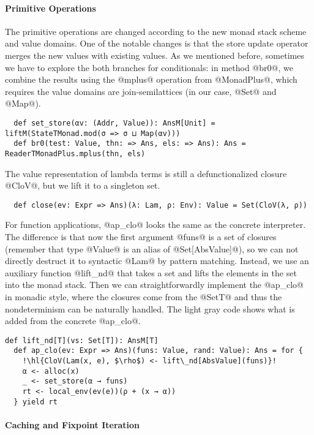 \paragraph{Primitive Operations} The primitive operations are changed according to
the new monad stack scheme and value domains. One of the notable changes is
that the store update operator merges the new values with existing values.
As we mentioned before, sometimes we have to explore the both branches for
conditionals: in method @br0@, we combine the results using the @mplus@
operation from @MonadPlus@, which requires the value domains are
join-semilattices (in our case, @Set@ and @Map@).
\begin{lstlisting}
  def set_store(αv: (Addr, Value)): AnsM[Unit] = liftM(StateTMonad.mod(σ => σ ⊔ Map(αv)))
  def br0(test: Value, thn: => Ans, els: => Ans): Ans = ReaderTMonadPlus.mplus(thn, els)
\end{lstlisting}

The value representation of lambda terms is still a defunctionalized closure
@CloV@, but we lift it to a singleton set.
\begin{lstlisting}
  def close(ev: Expr => Ans)(λ: Lam, ρ: Env): Value = Set(CloV(λ, ρ))
\end{lstlisting}

For function applications, @ap_clo@ looks the same as the concrete interpreter.
The difference is that now the first argument @funs@ is a set of closures (remember
that type @Value@ is an alias of @Set[AbsValue]@), so we can not directly
destruct it to syntactic @Lam@ by pattern matching. Instead, we use an
auxiliary function @lift_nd@ that takes a set and lifts the elements in the set
into the monad stack. Then we can straightforwardly implement the @ap_clo@ in
monadic style, where the closures come from the @SetT@ and thus the
nondeterminism can be naturally handled. The light gray code shows what is
added from the concrete
@ap_clo@.
\begin{lstlisting}[escapechar=!]
  def lift_nd[T](vs: Set[T]): AnsM[T]
  def ap_clo(ev: Expr => Ans)(funs: Value, rand: Value): Ans = for {
    !\hl{CloV(Lam(x, e), $\rho$) <- lift\_nd[AbsValue](funs)}!
    α <- alloc(x)
    _ <- set_store(α → funs)
    rt <- local_env(ev(e))(ρ + (x → α))
  } yield rt
\end{lstlisting}

\paragraph{Caching and Fixpoint Iteration}

